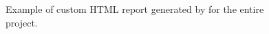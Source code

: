 
\begin{figure}[!ht]
\begin{center}
\qquad
{}
\caption{Example of custom HTML report generated by \toolname for
the entire project.}\label{fig:custom-html-report}
\end{center}
\end{figure}
